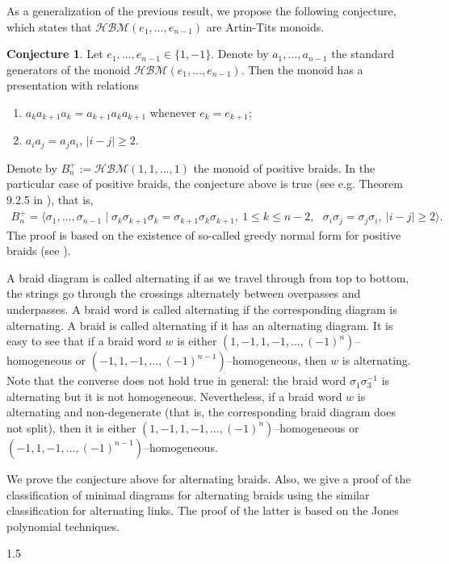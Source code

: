 \documentclass[11pt]{amsart}
\theoremstyle{plain}
\theoremstyle{definition}
\newtheorem{conjecture}[Theorem]{Conjecture}
\numberwithin{equation}{section}
\begin{document}
As a generalization of the previous result, we propose the following conjecture, which states that $\mathcal{HBM}(e_1, \ldots, e_{n-1})$ are Artin-Tits monoids.
\begin{conjecture}\label{HBGR} 
Let $e_1, \ldots, e_{n-1} \in \{1,-1\}$. Denote by $a_1, \ldots, a_{n-1}$ the standard generators of the monoid $\mathcal{HBM}(e_1, \ldots, e_{n-1})$. Then the monoid has a presentation with relations
\begin{enumerate}
\item $a_ka_{k+1}a_k = a_{k+1}a_ka_{k+1}$ whenever $e_k = e_{k+1}$;
\item $a_ia_j = a_ja_i$, $|i-j| \geq 2$.
\end{enumerate}
\end{conjecture}

Denote by $B_n^+ := \mathcal{HBM}(1,1,\ldots,1)$ the monoid of positive braids. In the particular case of positive braids, the conjecture above is true (see e.g. Theorem 9.2.5 in \cite{WPG}), that is,
\begin{align*}
B_n^+ = \langle \sigma_1, \ldots, \sigma_{n-1} \mid \sigma_k\sigma_{k+1}\sigma_k=\sigma_{k+1}\sigma_k\sigma_{k+1},\ 1 \leq k \leq n-2, \ \ \  \sigma_i\sigma_j=\sigma_j\sigma_i, \ |i-j|\geq 2 \rangle.
\end{align*}
The proof is based on the existence of so-called greedy normal form for positive braids (see \cite{GarsideBook}).

A braid diagram is called alternating if as we travel through from top to bottom, the strings go through the crossings alternately between overpasses and underpasses. A braid word is called alternating if the corresponding diagram is alternating. A braid is called alternating if it has an alternating diagram. It is easy to see that if a braid word $w$ is either $(1,-1,1,-1,\ldots,(-1)^n)$--homogeneous or $(-1,1,-1,\ldots,(-1)^{n-1})$--homogeneous, then $w$ is alternating. Note that the converse does not hold true in general: the braid word $\sigma_1\sigma_3^{-1}$ is alternating but it is not homogeneous. Nevertheless, if a braid word $w$ is alternating and non-degenerate (that is, the corresponding braid diagram does not split), then it is either $(1,-1,1,-1,\ldots,(-1)^n)$--homogeneous or $(-1,1,-1,\ldots,(-1)^{n-1})$--homogeneous.

We prove the conjecture above for alternating braids. Also, we give a proof of the classification of minimal diagrams for alternating braids using the similar classification for alternating links. The proof of the latter is based on the Jones polynomial techniques.
\begin{spacing}{1.5}
\end{spacing}
\end{document}
